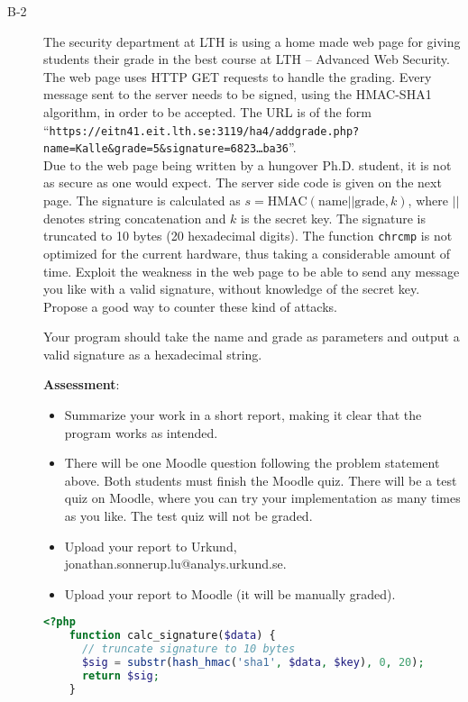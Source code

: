 \documentclass{article}
\begin{document}
\begin{description}
			
			\item[B-2]{The security department at LTH is using a home made web page for giving students their grade in the best course
				at LTH -- Advanced Web Security. The web page uses HTTP GET requests to handle the grading. Every message sent to the server
				needs to be signed, using the HMAC-SHA1 algorithm, in order to be accepted. The URL is of the form\\
				``\texttt{https://eitn41.eit.lth.se:3119/ha4/addgrade.php?name=Kalle\&grade=5\&signature=6823\ldots ba36}''.\\
				Due to the web page being written by a hungover Ph.D. student, it is not as secure as one would expect.
				The server side code is given on the next page.
				The signature is calculated as $s = \textrm{HMAC}(\textrm{name}||\textrm{grade}, k)$, where $||$ denotes 
				string concatenation and $k$ is the secret key. The signature is truncated to 10 bytes (20 hexadecimal digits).
				The function \texttt{chrcmp} is not optimized for the current hardware, 
				thus taking a considerable amount of time.
				Exploit the weakness in the web page to be able to send any message you like with a valid signature, 
				without knowledge of the secret key. Propose a good way to counter these kind of attacks.
				
				Your program should take the name and grade as parameters and output a valid signature as a hexadecimal string.
				
				\textbf{Assessment}:
				\begin{itemize}
					\item Summarize your work in a short report, making it clear that the program works as intended.
					
					\item There will be one Moodle question following the problem statement above. Both students must finish the Moodle quiz.
					There will be a test quiz on Moodle, where you can try your implementation as many times as you like. The test quiz will not be graded.
					
					\item Upload your report to Urkund, jonathan.sonnerup.lu@analys.urkund.se.
					
					\item Upload your report to Moodle (it will be manually graded).
				\end{itemize}
				
	\begin{lstlisting}[float=h, style=customc, language=php] 
	<?php
	function calc_signature($data) {
	  // truncate signature to 10 bytes
	  $sig = substr(hash_hmac('sha1', $data, $key), 0, 20);
	  return $sig;
	}
	

\end{lstlisting}}
\end{description}
\end{document}
